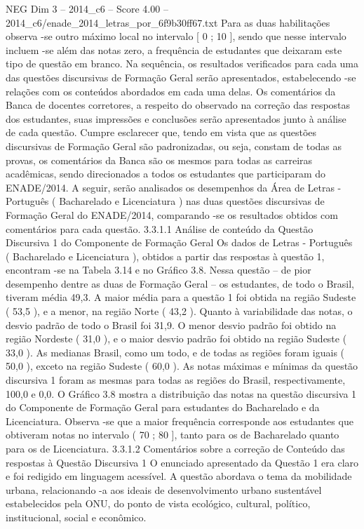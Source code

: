 \begin{textsample}{NEG Dim 3 – 2014\_c6 – Score 4.00 – 2014\_c6/enade\_2014\_letras\_por\_6f9b30ff67.txt}
Para as duas habilitações observa -se outro máximo local no intervalo [ 0 ; 10 ], sendo que nesse intervalo incluem -se além das notas zero, a frequência de estudantes que deixaram este tipo de questão em branco.
Na sequência, os resultados verificados para cada uma das questões discursivas de Formação Geral serão apresentados, estabelecendo -se relações com os conteúdos abordados em cada uma delas.
Os comentários da Banca de docentes corretores, a respeito do observado na correção das respostas dos estudantes, suas impressões e conclusões serão apresentados junto à análise de cada questão.
Cumpre esclarecer que, tendo em vista que as questões discursivas de Formação Geral são padronizadas, ou seja, constam de todas as provas, os comentários da Banca são os mesmos para todas as carreiras acadêmicas, sendo direcionados a todos os estudantes que participaram do ENADE/2014.
A seguir, serão analisados os desempenhos da Área de Letras - Português ( Bacharelado e Licenciatura ) nas duas questões discursivas de Formação Geral do ENADE/2014, comparando -se os resultados obtidos com comentários para cada questão. 3.3.1.1 Análise de conteúdo da Questão Discursiva 1 do Componente de Formação Geral Os dados de Letras - Português ( Bacharelado e Licenciatura ), obtidos a partir das respostas à questão 1, encontram -se na Tabela 3.14 e no Gráfico 3.8.
Nessa questão – de pior desempenho dentre as duas de Formação Geral – os estudantes, de todo o Brasil, tiveram média 49,3.
A maior média para a questão 1 foi obtida na região Sudeste ( 53,5 ), e a menor, na região Norte ( 43,2 ).
Quanto à variabilidade das notas, o desvio padrão de todo o Brasil foi 31,9.
O menor desvio padrão foi obtido na região Nordeste ( 31,0 ), e o maior desvio padrão foi obtido na região Sudeste ( 33,0 ).
As medianas Brasil, como um todo, e de todas as regiões foram iguais ( 50,0 ), exceto na região Sudeste ( 60,0 ).
As notas máximas e mínimas da questão discursiva 1 foram as mesmas para todas as regiões do Brasil, respectivamente, 100,0 e 0,0.
O Gráfico 3.8 mostra a distribuição das notas na questão discursiva 1 do Componente de Formação Geral para estudantes do Bacharelado e da Licenciatura.
Observa -se que a maior frequência corresponde aos estudantes que obtiveram notas no intervalo ( 70 ; 80 ], tanto para os de Bacharelado quanto para os de Licenciatura. 3.3.1.2 Comentários sobre a correção de Conteúdo das respostas à Questão Discursiva 1 O enunciado apresentado da Questão 1 era claro e foi redigido em linguagem acessível.
A questão abordava o tema da mobilidade urbana, relacionando -a aos ideais de desenvolvimento urbano sustentável estabelecidos pela ONU, do ponto de vista ecológico, cultural, político, institucional, social e econômico.

\end{textsample}
